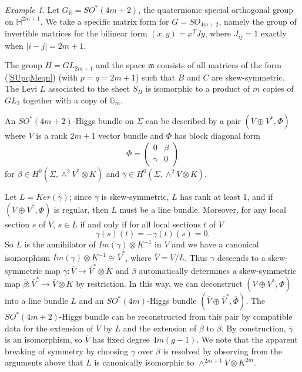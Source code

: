 \documentclass{amsart}
\theoremstyle{remark}
\newtheorem{example}[theorem]{Example}
\numberwithin{theorem}{section}
\numberwithin{equation}{section}
\begin{document}
\begin{example}\label{SOQuatAbnexm}
    Let $G_{\mathbb{R}} = SO^*(4m+2)$, the quaternionic special orthogonal group on $\mathbb{H}^{2m+1}$. We take a specific matrix form for $G = SO_{4m+2}$, namely the group of invertible matrices for the bilinear form $(x,y) = x^TJy$, where $J_{ij} = 1$ exactly when $|i-j| = 2m+1$.
    
    The group $H = GL_{2m+1}$ and the space $\mathfrak{m}$ consists of all matrices of the form (\ref{SUpqMeqn}) (with $p=q=2m+1$) such that $B$ and $C$ are skew-symmetric. The Levi $L$ associated to the sheet $S_H$ is isomorphic to a product of $m$ copies of $GL_2$ together with a copy of $\mathbb{G}_m$. 

    An $SO^*(4m+2)$-Higgs bundle on $\Sigma$ can be described by a pair $(V \oplus V^*, \Phi)$ where $V$ is a rank $2m+1$ vector bundle and $\Phi$ has block diagonal form
\begin{equation}
    \Phi = \begin{pmatrix}
        0 & \beta \\
        \gamma & 0
    \end{pmatrix}
\end{equation}
for $\beta \in H^0(\Sigma, \wedge^2 V^* \otimes K)$ and $\gamma \in H^0(\Sigma, \wedge^2 V \otimes K)$.

Let $L = Ker(\gamma)$; since $\gamma$ is skew-symmetric, $L$ has rank at least 1, and if $(V \oplus V^*, \Phi)$ is regular, then $L$ must be a line bundle. Moreover, for any local section $s$ of $V$, $s \in L$ if and only if for all local sections $t$ of $V$
\begin{equation}
    \gamma(s)(t) = -\gamma(t)(s) = 0.
\end{equation}
So $L$ is the annihilator of $Im(\gamma) \otimes K^{-1}$ in $V$ and we have a canonical isomorphism $Im(\gamma) \otimes K^{-1} \cong \overline{V}^*$, where $\overline{V} = V/L$. Thus $\gamma$ descends to a skew-symmetric map $\overline{\gamma}:\overline{V} \rightarrow \overline{V}^* \otimes K$ and $\beta$ automatically determines a skew-symmetric map $\overline{\beta}:\overline{V}^* \rightarrow \overline{V} \otimes K$ by restriction. In this way, we can deconstruct $(V \oplus V^*,\Phi)$ into a line bundle $L$ and an $SO^*(4m)$-Higgs bundle $(\overline{V} \oplus \overline{V}^*,\overline{\Phi})$. The $SO^*(4m+2)$-Higgs bundle can be reconstructed from this pair by compatible data for the extension of $\overline{V}$ by $L$ and the extension of $\overline{\beta}$ to $\beta$. By construction, $\overline{\gamma}$ is an isomorphism, so $\overline{V}$ has fixed degree $4m(g-1)$. We note that the apparent breaking of symmetry by choosing $\gamma$ over $\beta$ is resolved by observing from the arguments above that $L$ is canonically isomorphic to $\wedge^{2m+1} V \otimes K^{2m}$.


\end{example}
\end{document}
